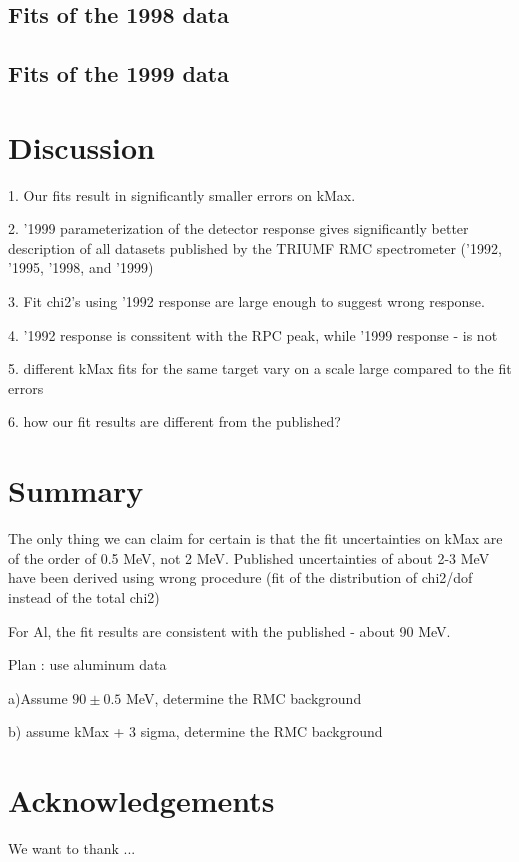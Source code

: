 \documentclass[12pt]{article}
\begin{document}
\subsection { Fits of the 1998 data }

\subsection { Fits of the 1999 data }

\section { Discussion }


1. Our fits result in significantly smaller errors on kMax.

2. '1999 parameterization of the detector response gives significantly better
    description of all datasets published by the TRIUMF RMC spectrometer
    ('1992, '1995, '1998, and '1999)

    3. Fit chi2's using '1992 response are large enough to suggest wrong response.

    4. '1992 response is conssitent with the RPC peak, while '1999 response - is not

    5. different kMax fits for the same target vary on a scale large compared to the
    fit errors

    6. how our fit results are different from the published? 


\section{ Summary }


The only thing we can claim for certain is that the fit uncertainties on kMax are
of the order of 0.5 MeV, not 2 MeV. Published uncertainties of about 2-3 MeV
have been derived using wrong procedure (fit of the distribution of chi2/dof
instead of the total chi2)


For Al, the fit results are consistent with the published - about 90 MeV.


Plan : use aluminum data

a)Assume $90 \pm 0.5$ MeV, determine the RMC background

b) assume kMax + 3 sigma, determine the RMC background

\section{ Acknowledgements }

We want to thank ...




\end{document}
